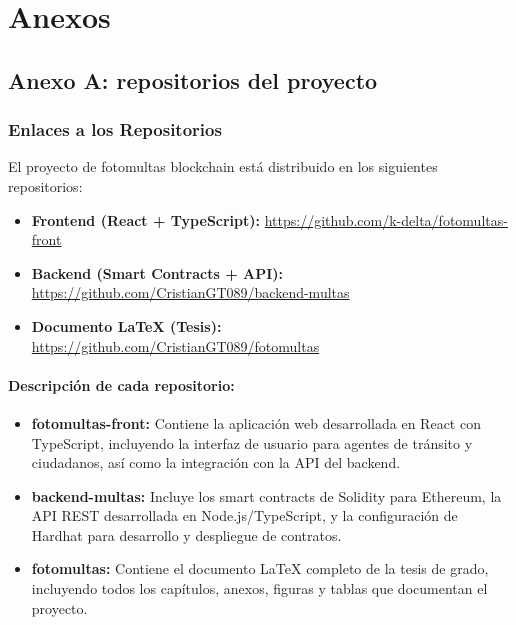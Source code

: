 \section{Anexos}



\subsection{Anexo A: repositorios del proyecto}

\subsubsection{Enlaces a los Repositorios}

El proyecto de fotomultas blockchain está distribuido en los siguientes repositorios:

\begin{itemize}
    \item \textbf{Frontend (React + TypeScript):} \url{https://github.com/k-delta/fotomultas-front}
    \item \textbf{Backend (Smart Contracts + API):} \url{https://github.com/CristianGT089/backend-multas}
    \item \textbf{Documento LaTeX (Tesis):} \url{https://github.com/CristianGT089/fotomultas}
\end{itemize}

\paragraph{Descripción de cada repositorio:}

\begin{itemize}
    \item \textbf{fotomultas-front:} Contiene la aplicación web desarrollada en React con TypeScript, incluyendo la interfaz de usuario para agentes de tránsito y ciudadanos, así como la integración con la API del backend.
    
    \item \textbf{backend-multas:} Incluye los smart contracts de Solidity para Ethereum, la API REST desarrollada en Node.js/TypeScript, y la configuración de Hardhat para desarrollo y despliegue de contratos.
    
    \item \textbf{fotomultas:} Contiene el documento LaTeX completo de la tesis de grado, incluyendo todos los capítulos, anexos, figuras y tablas que documentan el proyecto.
\end{itemize}

